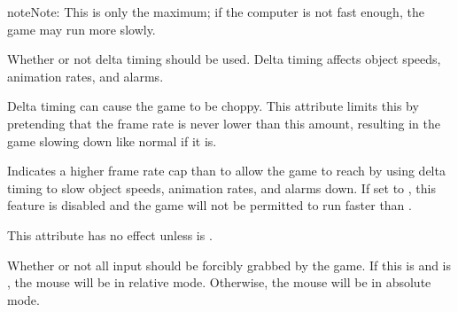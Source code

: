 \documentclass[letterpaper,10pt,english]{sphinxmanual}
\begin{document}
\begin{fulllineitems}
\begin{fulllineitems}
\begin{notice}{note}{Note:}
This is only the maximum; if the computer is not fast enough,
the game may run more slowly.
\end{notice}

\end{fulllineitems}


\begin{fulllineitems}
\label{dsp:sge.dsp.Game.delta}
Whether or not delta timing should be used.  Delta timing affects
object speeds, animation rates, and alarms.

\end{fulllineitems}


\begin{fulllineitems}
\label{dsp:sge.dsp.Game.delta_min}
Delta timing can cause the game to be choppy.  This attribute
limits this by pretending that the frame rate is never lower than
this amount, resulting in the game slowing down like normal if it
is.

\end{fulllineitems}


\begin{fulllineitems}
\label{dsp:sge.dsp.Game.delta_max}
Indicates a higher frame rate cap than {\hyperref[dsp:sge.dsp.Game.fps]{\emph{}}} to allow the
game to reach by using delta timing to slow object speeds,
animation rates, and alarms down.  If set to , this
feature is disabled and the game will not be permitted to run
faster than {\hyperref[dsp:sge.dsp.Game.fps]{\emph{}}}.

This attribute has no effect unless {\hyperref[dsp:sge.dsp.Game.delta]{\emph{}}} is
.

\end{fulllineitems}


\begin{fulllineitems}
\label{dsp:sge.dsp.Game.grab_input}
Whether or not all input should be forcibly grabbed by the game.
If this is  and  is
, the mouse will be in relative mode.  Otherwise,
the mouse will be in absolute mode.


\end{fulllineitems}
\end{fulllineitems}
\end{document}
